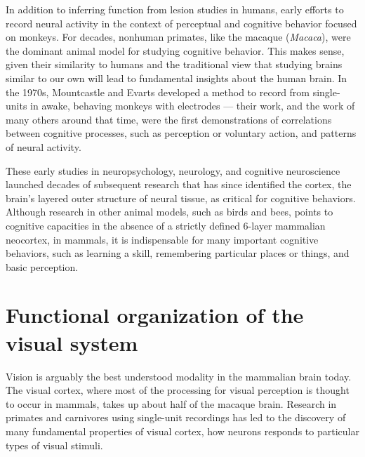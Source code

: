 In addition to inferring function from lesion studies in humans, early efforts to record neural activity in the context of perceptual and cognitive behavior focused on monkeys. For decades, nonhuman primates, like the macaque (\textit{Macaca}), were the dominant animal model for studying cognitive behavior. This makes sense, given their similarity to humans and the traditional view that studying brains similar to our own will lead to fundamental insights about the human brain. In the 1970s, Mountcastle and Evarts developed a method to record from single-units in awake, behaving monkeys with electrodes --- their work, and the work of many others around that time, were the first demonstrations of correlations between cognitive processes, such as perception or voluntary action, and patterns of neural activity\cite{Mountcastle1975,Evarts1968,Hubel1968}. 

These early studies in neuropsychology, neurology, and cognitive neuroscience launched decades of subsequent research that has since identified the cortex, the brain's layered outer structure of neural tissue, as critical for cognitive behaviors. Although research in other animal models, such as birds and bees, points to cognitive capacities in the absence of a strictly defined 6-layer mammalian neocortex, in mammals, it is indispensable for many important cognitive behaviors, such as learning a skill\cite{Kawai2015}, remembering particular places or things\cite{Squire1991}, and basic perception\cite{Tanaka1991,DiCarlo2012}. 

\section{Functional organization of the visual system}
Vision is arguably the best understood modality in the mammalian brain today. The visual cortex, where most of the processing for visual perception is thought to occur in mammals, takes up about half of the macaque brain\cite{Felleman1991}. Research in primates and carnivores using single-unit recordings has led to the discovery of many fundamental properties of visual cortex, how neurons responds to particular types of visual stimuli\cite{Hubel1962,Hubel1968,Reid1991}. 

